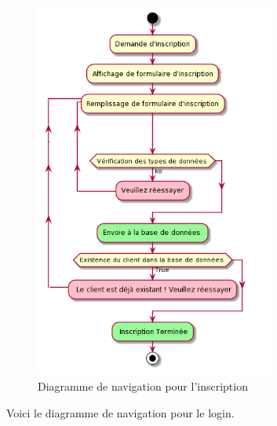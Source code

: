 \begin{figure}[H]
\begin{centering}
\includegraphics[width=0.7\textwidth,height=0.85\textheight]{Ressources/Inscription_navigation.png}
\caption{Diagramme de navigation pour l'inscription}
\par
\end{centering}
\end{figure}

\clearpage

Voici le diagramme de navigation pour le login.

